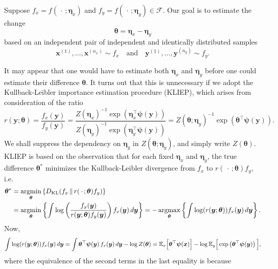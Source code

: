 \documentclass[11pt]{article}
\numberwithin{equation}{section}
\numberwithin{theorem}{section}
\def\fatx{\boldsymbol{x}}
\def\faty{\boldsymbol{y}}
\def\fateta{\boldsymbol{\eta}}
\def\fattheta{\boldsymbol{\theta}}
\def\fatpsi{\boldsymbol{\psi}}
\theoremstyle{definition}
\theoremstyle{remark}
\begin{document}
Suppose $f_x = f(\,\cdot\,;\fateta_x)$ and $f_y = f(\,\cdot\,;\fateta_y) \in \mathcal{F}$.
Our goal is to estimate the change
\begin{equation}
\fattheta = \fateta_x - \fateta_y
\end{equation}
based on an independent pair of independent and identically distributed samples
\begin{equation}
\fatx^{(1)}, \dots, \fatx^{(n_x)} \sim f_x
\quad\text{and}\quad
\faty^{(1)}, \dots, \faty^{(n_y)} \sim f_y.
\end{equation}

It may appear that one would have to estimate both $\fateta_x$ and $\fateta_y$ before one could estimate their difference $\fattheta$.
It turns out that this is unnecessary if we adopt the Kullback-Leibler importance estimation procedure (KLIEP), which arises from consideration of the ratio
\begin{equation}
r(\faty;\fattheta)
= \frac{f_x(\faty)}{f_y(\faty)}
= \frac{Z(\fateta_x)^{-1} \exp\left( \fateta_x^\top \fatpsi(\faty) \right)}{Z(\fateta_y)^{-1} \exp\left( \fateta_y^\top \fatpsi(\faty) \right)}
= Z(\fattheta;\fateta_y)^{-1} \exp\left( \fattheta^\top \fatpsi(\faty) \right).
\end{equation}
We shall suppress the dependency on $\fateta_y$ in $Z(\fattheta;\fateta_y)$, and simply write $Z(\fattheta)$.
KLIEP is based on the observation that for each fixed $\fateta_x$ and $\fateta_y$, the true difference $\fattheta^*$ minimizes the Kullback-Leibler divergence from $f_x$ to $r(\,\cdot\,;\fattheta) f_y$, i.e.
\begin{equation}
\begin{aligned}
\fattheta^*
&= \argmin_{\fattheta} \left\{ D_\text{KL}(f_x \,\|\, r(\,\cdot\,;\fattheta) f_y) \right\} \\
&= \argmin_{\fattheta} \left\{ \int \log \left( \frac{f_x(\faty)}{r(\faty;\fattheta) f_y(\faty)} \right) f_x(\faty) \, d\faty \right\}
= -\argmax_{\fattheta} \left\{ \int \log( r(\faty;\fattheta) ) f_x(\faty) \, d\faty \right\}.
\end{aligned}
\end{equation}
Now,
\begin{equation}
\int \log( r(\faty;\fattheta) ) f_x(\faty) \, d\faty
= \int \fattheta^\top \fatpsi(\faty) \, f_x(\faty) \, d\faty - \log Z(\fattheta)
= \EE_x\Big[ \fattheta^\top \fatpsi(\fatx) \Big] - \log \EE_y\Big[ \exp\left( \fattheta^\top \fatpsi(\faty) \right) \Big],
\end{equation}
where the equivalence of the second terms in the last equality is because
\end{document}
